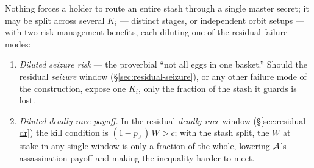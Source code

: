 \begin{remark}
Nothing forces a holder to route an entire stash through a single master secret; it
may be split across several $K_i$ --- distinct stages, or independent orbit setups
--- with two risk-management benefits, each diluting one of the residual failure
modes:
\begin{enumerate}[nosep,leftmargin=1.6em]
  \item \emph{Diluted seizure risk} --- the proverbial ``not all eggs in one
        basket.'' Should the residual \emph{seizure} window
        (\S\ref{sec:residual-seizure}), or any other failure mode of the
        construction, expose one $K_i$, only the fraction of the stash it guards is
        lost.
  \item \emph{Diluted deadly-race payoff.} In the residual \emph{deadly-race}
        window (\S\ref{sec:residual-dr}) the kill condition is $(1-p_A)\,W > c$;
        with the stash split, the $W$ at stake in any single window is only a
        fraction of the whole, lowering $\mathcal{A}$'s assassination payoff and
        making the inequality harder to meet.
\end{enumerate}
\end{remark}
